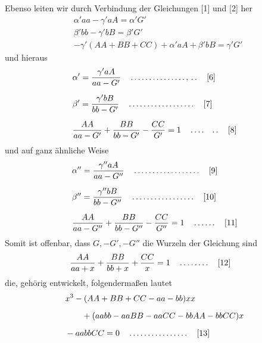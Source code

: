Ebenso leiten wir durch Verbindung der Gleichungen [1] und [2] her
\[
\begin{aligned}
&\alpha'aa-\gamma'aA=\alpha'G'\\[6pt]
&\beta'bb-\gamma'bB=\beta'G'\\[6pt]
&-\gamma'(AA+BB+CC)+\alpha'aA+\beta'bB=\gamma'G'
\end{aligned}
\]
und hieraus
\[
\begin{aligned}
&\alpha'{}=\frac{\gamma'aA}{aa-G'}\quad\mathinner{.\,.\,.\,.\,.\,.\,.\,.\,.\,.\,.\,.\,.\,.\,.\,,\,.\,.}\quad\text{[6]}\\[6pt]
&\beta'{}=\frac{\gamma'bB}{bb-G'}\quad\mathinner{.\,.\,.\,.\,.\,.\,.\,.\,.\,.\,.\,.\,.\,.\,.\,.\,.\,.}\quad\text{[7]}\\[6pt]
&\frac{AA}{aa-G'}+\frac{BB}{bb-G'}-\frac{CC}{G'}=1\quad\mathinner{.\,.\,.\,.\quad.\,.}\quad\text{[8]}
\end{aligned}
\]
und auf ganz ähnliche Weise
\[
\begin{aligned}
&\alpha''{}=\frac{\gamma''aA}{aa-G''}\quad\mathinner{.\,.\,.\,.\,.\,.\,.\,.\,.\,.\,.\,.\,.\,.\,.\,.\,.\,.}\quad\text{[9]}\\[6pt]
&\beta''{}=\frac{\gamma''bB}{bb-G''}\quad\mathinner{.\,.\,.\,.\,.\,.\,.\,.\,.\,.\,.\,.\,.\,.\,.\,.\,.}\quad\text{[10]}\\[6pt]
&\frac{AA}{aa-G''}+\frac{BB}{bb-G''}-\frac{CC}{G''}=1\quad\mathinner{.\,.\,.\,.\,.\,.}\quad\text{[11]}
\end{aligned}
\]
Somit ist offenbar, dass $G,-G',-G''$ die Wurzeln der Gleichung sind
\[
\begin{aligned}
&\frac{AA}{aa+x}+\frac{BB}{bb+x}+\frac{CC}{x}=1\quad\mathinner{.\,.\,.\,.\,.\,.\,.\,.}\quad\text{[12]}
\end{aligned}
\]
die, gehörig entwickelt, folgendermaßen lautet
\[
\begin{aligned}
&x^3-(AA+BB+CC-aa-bb)xx\\[6pt]
&\qquad{}+(aabb-aaBB-aaCC-bbAA-bbCC)x\\[6pt]
&-aabbCC=0\quad\mathinner{.\,.\,.\,.\,.\,.\,.\,.\,.\,.\,.\,.\,.\,.\,.\,.}\quad\text{[13]}
\end{aligned}
\]

\clearpage
\endgroup
